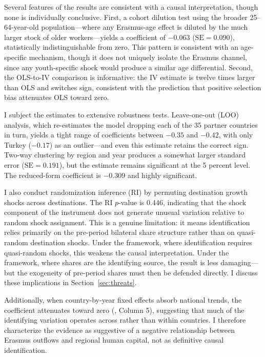 \documentclass[12pt]{article}
\begin{document}
Several features of the results are consistent with a causal interpretation, though none is individually conclusive. First, a cohort dilution test using the broader 25--64-year-old population---where any Erasmus-age effect is diluted by the much larger stock of older workers---yields a coefficient of $-0.063$ ($\text{SE} = 0.090$), statistically indistinguishable from zero. This pattern is consistent with an age-specific mechanism, though it does not uniquely isolate the Erasmus channel, since any youth-specific shock would produce a similar age differential. Second, the OLS-to-IV comparison is informative: the IV estimate is twelve times larger than OLS and switches sign, consistent with the prediction that positive selection bias attenuates OLS toward zero.

I subject the estimates to extensive robustness tests. Leave-one-out (LOO) analysis, which re-estimates the model dropping each of the 35 partner countries in turn, yields a tight range of coefficients between $-0.35$ and $-0.42$, with only Turkey ($-0.17$) as an outlier---and even this estimate retains the correct sign. Two-way clustering by region and year produces a somewhat larger standard error ($\text{SE} = 0.191$), but the estimate remains significant at the 5 percent level. The reduced-form coefficient is $-0.309$ and highly significant.

I also conduct randomization inference (RI) by permuting destination growth shocks across destinations. The RI $p$-value is 0.446, indicating that the shock component of the instrument does not generate unusual variation relative to random shock assignment. This is a genuine limitation: it means identification relies primarily on the pre-period bilateral share structure rather than on quasi-random destination shocks. Under the \citet{borusyak_hull_jaravel_2022} framework, where identification requires quasi-random shocks, this weakens the causal interpretation. Under the \citet{goldsmith_pinkham_sorkin_swift_2020} framework, where shares are the identifying source, the result is less damaging---but the exogeneity of pre-period shares must then be defended directly. I discuss these implications in Section~\ref{sec:threats}.

Additionally, when country-by-year fixed effects absorb national trends, the coefficient attenuates toward zero (, Column 5), suggesting that much of the identifying variation operates across rather than within countries. I therefore characterize the evidence as suggestive of a negative relationship between Erasmus outflows and regional human capital, not as definitive causal identification.
\end{document}
